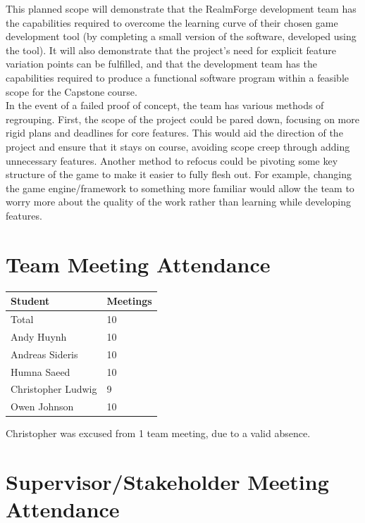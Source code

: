 \documentclass{article}
\begin{document}
\noindent This planned scope will demonstrate that the RealmForge development 
team has 
the capabilities required to overcome the learning curve of their chosen game 
development tool (by completing a small version of the software, developed 
using the tool). It will also demonstrate that the project's need for explicit 
feature variation points can be fulfilled, and that the development team has 
the capabilities required to produce a functional software program within a 
feasible scope for the Capstone course.
\\

\noindent In the event of a failed proof of concept, the team has various 
methods of regrouping. First, the scope of the project could be pared down, 
focusing on more rigid plans and deadlines for core features. This would aid 
the direction of the project and ensure that it stays on course, avoiding scope 
creep through adding unnecessary features. Another method to refocus could be 
pivoting some key structure of the game to make it easier to fully flesh out. 
For example, changing the game engine/framework to something more familiar 
would allow the team to worry more about the quality of the work rather than 
learning while developing features. 

\section{Team Meeting Attendance}

\begin{table}[H]
\centering
\begin{tabular}{ll}
\toprule
\textbf{Student} & \textbf{Meetings}\\
\midrule
Total & 10\\
Andy Huynh  & 10\\
Andreas Sideris & 10\\
Humna Saeed & 10\\
Christopher Ludwig & 9\\
Owen Johnson & 10\\
\bottomrule
\end{tabular}
\end{table}

Christopher was excused from 1 team meeting, due to a valid absence.

\section{Supervisor/Stakeholder Meeting Attendance}
\end{document}
